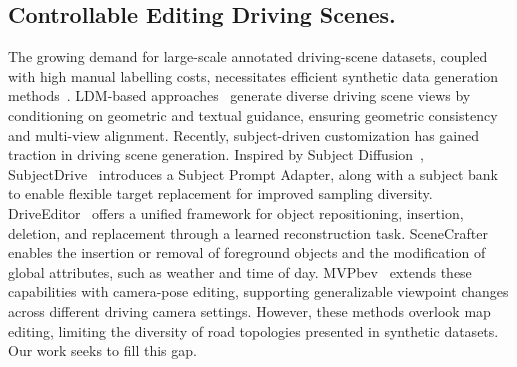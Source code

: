 \subsection{Controllable Editing Driving Scenes.}
The growing demand for large-scale annotated driving-scene datasets, coupled with high manual labelling costs, necessitates efficient synthetic data generation methods~\cite{gao2023magicdrive, zhou2024simgen, hu2024drivingworld, hu2024drivingworld}. 
LDM-based approaches~\cite{lu2024wovogen, swerdlow2024street, wang2024drivedreamer, zhang2024perldiff,  swerdlow2024street, li2025dualdiff} generate diverse driving scene views by conditioning on geometric and textual guidance, ensuring geometric consistency and multi-view alignment.
Recently, subject-driven customization has gained traction in driving scene generation. Inspired by Subject Diffusion~\cite{ma2024subject}, SubjectDrive~\cite{huang2025subjectdrive} introduces a Subject Prompt Adapter, along with a subject bank to enable flexible target replacement for improved sampling diversity.
DriveEditor~\cite{liang2025driveeditor} offers a unified framework for object repositioning, insertion, deletion, and replacement through a learned reconstruction task.
SceneCrafter~\cite{zhu2025scenecrafter} enables the insertion or removal of foreground objects and the modification of global attributes, such as weather and time of day.
MVPbev~\cite{liu2024mvpbev} extends these capabilities with camera-pose editing, supporting generalizable viewpoint changes across different driving camera settings.
However, these methods overlook map editing, limiting the diversity of road topologies presented in synthetic datasets. Our work seeks to fill this gap.


